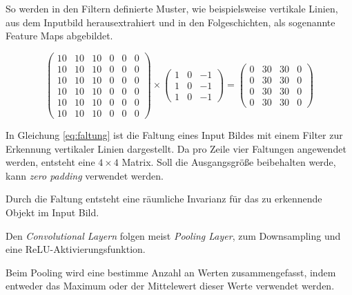 So werden in den Filtern definierte Muster, wie 
beispielsweise vertikale Linien, 
aus dem Inputbild herausextrahiert und in 
den Folgeschichten, als sogenannte Feature Maps abgebildet.


\vspace{1cm}
\begin{equation}
    \label{eq:faltung}
    \begin{pmatrix}
        10 & 10 & 10 & 0 & 0 & 0\\
        10 & 10 & 10 & 0 & 0 & 0\\
        10 & 10 & 10 & 0 & 0 & 0\\
        10 & 10 & 10 & 0 & 0 & 0\\
        10 & 10 & 10 & 0 & 0 & 0\\
        10 & 10 & 10 & 0 & 0 & 0
    \end{pmatrix}
    \times
    \begin{pmatrix}
        1 & 0 & -1\\
        1 & 0 & -1\\
        1 & 0 & -1
    \end{pmatrix}
    = 
    \begin{pmatrix}
        0 & 30 & 30 & 0\\
        0 & 30 & 30 & 0\\
        0 & 30 & 30 & 0\\
        0 & 30 & 30 & 0
    \end{pmatrix}
\end{equation}
\vspace{0.5cm}
\begin{figure}[H]
    \centering
    \def\svgwidth{0.6\textwidth}
    
    \caption{}
    \label{fig:faltung3}
\end{figure}

In Gleichung \ref{eq:faltung} ist die Faltung 
eines Input Bildes mit einem Filter zur Erkennung 
vertikaler Linien dargestellt. Da pro Zeile 
vier Faltungen angewendet werden, entsteht 
eine $4\times4$ Matrix. Soll die Ausgangsgröße 
beibehalten werde, kann \textit{zero padding}
verwendet werden.

Durch die Faltung entsteht eine räumliche 
Invarianz für das zu erkennende Objekt im 
Input Bild.

Den \textit{Convolutional Layern} folgen meist \textit{Pooling Layer}, 
zum Downsampling und eine ReLU-Aktivierungsfunktion.

Beim Pooling wird eine bestimme Anzahl an Werten 
zusammengefasst, indem entweder das Maximum oder der 
Mittelewert dieser Werte verwendet werden.

